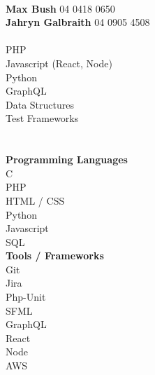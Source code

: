 \documentclass[9pt]{developercv}
\newcommand{\CC}{C\nolinebreak\hspace{-.05em}\raisebox{.4ex}{\tiny\bf +}\nolinebreak\hspace{-.10em}\raisebox{.4ex}{\tiny\bf +}}
\def\CC{{C\nolinebreak[4]\hspace{-.05em}\raisebox{.4ex}{\tiny\bf ++}}}
\begin{document}
	\begin{minipage}[t]{0.3\textwidth}		%
		\\
		\textbf{Max Bush} 04 0418 0650\\
		\textbf{Jahryn Galbraith} 04 0905 4508\\

		\\
		{PHP}\\
		{Javascript (React, Node)}\\
		{Python}\\
		{GraphQL}\\
		{Data Structures}\\
		{Test Frameworks}\\
		
		\\
		\\\textbf{Programming Languages}\\
		{\CC}\\
		{PHP}\\
		{HTML / CSS}\\
		{Python}\\
		{Javascript}\\
		{SQL}\\

		\textbf{Tools / Frameworks}\\
		{Git}\\
		{Jira}\\
		{Php-Unit}\\
		{SFML}\\
		{GraphQL}\\
		{React}\\
		{Node}\\
		{AWS}\\

	\end{minipage}
\end{document}
